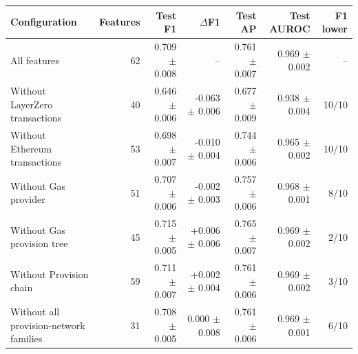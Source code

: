 \begin{tabular}{lrrrrrr}
\toprule
Configuration & Features & Test F1 & $\Delta$F1 & Test AP & Test AUROC & F1 lower \\
\midrule
All features & 62 & 0.709 $\pm$ 0.008 & -- & 0.761 $\pm$ 0.007 & 0.969 $\pm$ 0.002 & -- \\
Without LayerZero transactions & 40 & 0.646 $\pm$ 0.006 & -0.063 $\pm$ 0.006 & 0.677 $\pm$ 0.009 & 0.938 $\pm$ 0.004 & 10/10 \\
Without Ethereum transactions & 53 & 0.698 $\pm$ 0.007 & -0.010 $\pm$ 0.004 & 0.744 $\pm$ 0.006 & 0.965 $\pm$ 0.002 & 10/10 \\
Without Gas provider & 51 & 0.707 $\pm$ 0.006 & -0.002 $\pm$ 0.003 & 0.757 $\pm$ 0.006 & 0.968 $\pm$ 0.001 & 8/10 \\
Without Gas provision tree & 45 & 0.715 $\pm$ 0.005 & +0.006 $\pm$ 0.006 & 0.765 $\pm$ 0.007 & 0.969 $\pm$ 0.002 & 2/10 \\
Without Provision chain & 59 & 0.711 $\pm$ 0.007 & +0.002 $\pm$ 0.004 & 0.761 $\pm$ 0.006 & 0.969 $\pm$ 0.002 & 3/10 \\
Without all provision-network families & 31 & 0.708 $\pm$ 0.005 & 0.000 $\pm$ 0.008 & 0.761 $\pm$ 0.006 & 0.969 $\pm$ 0.001 & 6/10 \\
\bottomrule
\end{tabular}
